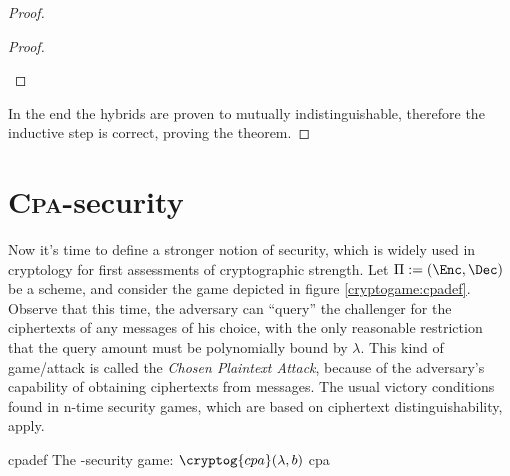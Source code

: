 \begin{proof}
\begin{proof}
\begin{cryptogame}

            \cseqdelay


        \end{cryptogame}
        
    \end{proof}

    In the end the hybrids are proven to mutually indistinguishable, therefore the inductive step is correct, proving the theorem.

\end{proof}

\section{\textsc{Cpa}-security}

Now it's time to define a stronger notion of security, which is widely used in cryptology for first assessments of cryptographic strength. Let $\Pi := (\Enc, \Dec)$ be a \ske{} scheme, and consider the game depicted in figure \ref{cryptogame:cpadef}. Observe that this time, the adversary can ``query'' the challenger for the ciphertexts of any messages of his choice, with the only reasonable restriction that the query amount must be polynomially bound by $\lambda$. This kind of game/attack is called the \emph{Chosen Plaintext Attack}, because of the adversary's capability of obtaining ciphertexts from messages. The usual victory conditions found in n-time security games, which are based on ciphertext distinguishability, apply.

\begin{cryptogame}
    {cpadef}
    {The \cpa-security game: $\cryptog{cpa}(\lambda, b)$}
    {cpa}


    \cseqbeginloop
    \cseqendloop

    \cseqdelay


    \cseqdelay

    \cseqbeginloop
    \cseqendloop

    \cseqdelay


\end{cryptogame}

